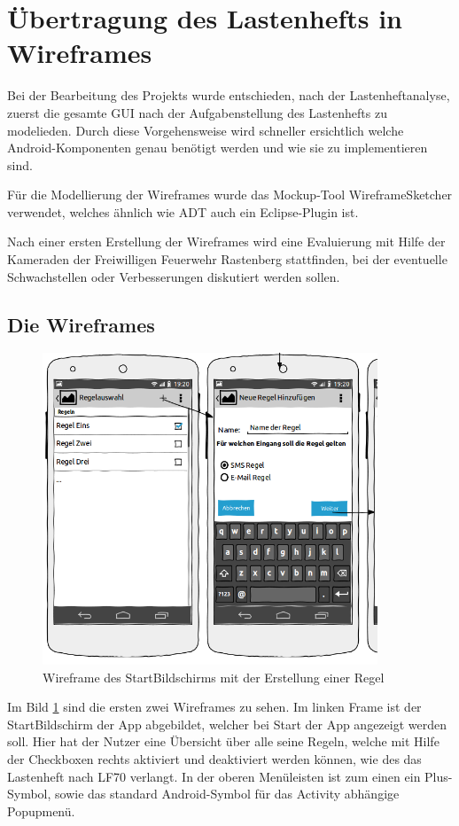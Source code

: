 \section{\"Ubertragung des Lastenhefts in Wireframes}

Bei der Bearbeitung des Projekts wurde entschieden, nach der Lastenheftanalyse, zuerst die gesamte GUI nach der Aufgabenstellung des Lastenhefts zu modelieden. Durch diese Vorgehensweise wird schneller ersichtlich welche Android-Komponenten genau ben\"otigt werden und wie sie zu implementieren sind.

F\"ur die Modellierung der Wireframes wurde das Mockup-Tool WireframeSketcher verwendet, welches \"ahnlich wie \ac{ADT} auch ein Eclipse-Plugin ist. 

Nach einer ersten Erstellung der Wireframes wird eine Evaluierung mit Hilfe der Kameraden der Freiwilligen Feuerwehr Rastenberg stattfinden, bei der eventuelle Schwachstellen oder Verbesserungen diskutiert werden sollen.

\subsection{Die Wireframes}
  
\begin{figure}
\vspace{-13pt}
\includegraphics[width=10cm]{Bilder/StartBildschirm.png}
\caption{Wireframe des StartBildschirms mit der Erstellung einer Regel}
\label{Wireframe StartBildschirm}
\vspace{-10pt}
\end{figure}
Im Bild \ref{Wireframe StartBildschirm} sind die ersten zwei Wireframes zu sehen. Im linken Frame ist der StartBildschirm der App abgebildet, welcher bei Start der App angezeigt werden soll. Hier hat der Nutzer eine \"Ubersicht \"uber alle seine Regeln, welche mit Hilfe der Checkboxen rechts aktiviert und deaktiviert werden k\"onnen, wie des das Lastenheft nach LF70 verlangt. In der oberen Men\"uleisten ist zum einen ein Plus-Symbol, sowie das standard Android-Symbol f\"ur das Activity abh\"angige Popupmen\"u.

